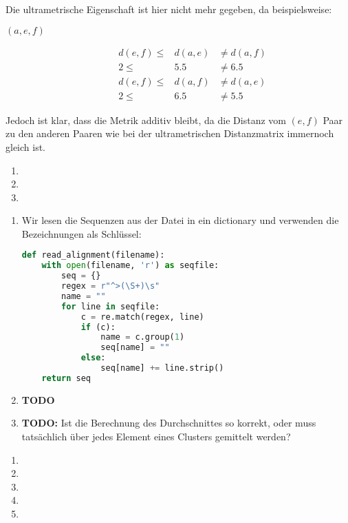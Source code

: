 \documentclass{homework}
\begin{document}
\begin{enumerate}
\begin{enumerate}
Die ultrametrische Eigenschaft ist hier nicht mehr gegeben, da beispielsweise:
\begin{description}
\item[$(a,e,f)$] \begin{eqnarray*}
d(e,f) \leq & d(a,e) & \neq d(a,f)\\
2 \leq & 5.5 & \neq 6.5\\
d(e,f) \leq & d(a,f) & \neq d(a,e)\\
2 \leq & 6.5 & \neq 5.5
\end{eqnarray*}
\end{description}
Jedoch ist klar, dass die Metrik additiv bleibt, da die Distanz vom $(e,f)$ Paar
zu den anderen Paaren wie bei der ultrametrischen Distanzmatrix immernoch gleich
ist.
\end{enumerate}

\begin{enumerate}
\item
\item
\item
\end{enumerate}

\begin{enumerate}
\item Wir lesen die Sequenzen aus der Datei in ein dictionary und verwenden die
Bezeichnungen als Schlüssel:

\begin{lstlisting}[language=python]
def read_alignment(filename):
	with open(filename, 'r') as seqfile:
		seq = {}
		regex = r"^>(\S+)\s"
		name = ""
		for line in seqfile:
			c = re.match(regex, line)
			if (c):
				name = c.group(1)
				seq[name] = ""
			else:
				seq[name] += line.strip()
	return seq
\end{lstlisting}

\item \textbf{TODO}

\item \textbf{TODO:} Ist die Berechnung des Durchschnittes so korrekt, oder muss
tatsächlich über jedes Element eines Clusters gemittelt werden?
\end{enumerate}

\begin{enumerate}
\item
\item
\item
\item
\item
\end{enumerate}

\end{enumerate}
\end{document}
